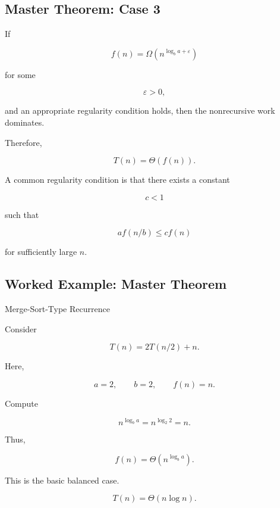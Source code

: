 \subsection{Master Theorem: Case 3}
\label{subsec:master-theorem-case-three}

If

\[
f(n)
=
\Omega\left(
n^{\log_ba+\varepsilon}
\right)
\]

for some

\[
\varepsilon>0,
\]

and an appropriate regularity condition holds, then the nonrecursive
work dominates.

Therefore,

\[
\boxed{
T(n)=\Theta(f(n)).
}
\]

A common regularity condition is that there exists a constant

\[
c<1
\]

such that

\[
af(n/b)\leq cf(n)
\]

for sufficiently large \(n\).

\subsection{Worked Example: Master Theorem}
\label{subsec:worked-master-theorem}

\begin{workedexamplebox}{Merge-Sort-Type Recurrence}

Consider

\[
T(n)=2T(n/2)+n.
\]

Here,

\[
a=2,
\qquad
b=2,
\qquad
f(n)=n.
\]

Compute

\[
n^{\log_ba}
=
n^{\log_2 2}
=
n.
\]

Thus,

\[
f(n)
=
\Theta\left(
n^{\log_ba}
\right).
\]

This is the basic balanced case.

\begin{answerbox}
\[
\boxed{
T(n)=\Theta(n\log n).
}
\]
\end{answerbox}

\end{workedexamplebox}


